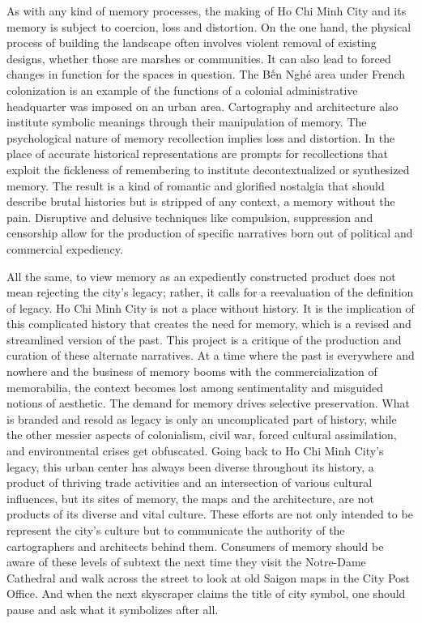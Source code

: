 As with any kind of memory processes, the making of Ho Chi Minh City and its memory is subject to coercion, loss and distortion. On the one hand, the physical process of building the landscape often involves violent removal of existing designs, whether those are marshes or communities. It can also lead to forced changes in function for the spaces in question. The Bến Nghé area under French colonization is an example of the functions of a colonial administrative headquarter was imposed on an urban area. Cartography and architecture also institute symbolic meanings through their manipulation of memory. The psychological nature of memory recollection implies loss and distortion. In the place of accurate historical representations are prompts for recollections that exploit the fickleness of remembering to institute decontextualized or synthesized memory.  The result is a kind of romantic and glorified nostalgia that should describe brutal histories but is stripped of any context, a memory without the pain. Disruptive and delusive techniques like compulsion, suppression and censorship allow for the production of specific narratives born out of political and commercial expediency.

All the same, to view memory as an expediently constructed product does not mean rejecting the city’s legacy; rather, it calls for a reevaluation of the definition of legacy. Ho Chi Minh City is not a place without history. It is the implication of this complicated history that creates the need for memory, which is a revised and streamlined version of the past. This project is a critique of the production and curation of these alternate narratives. At a time where the past is everywhere and nowhere and the business of memory booms with the commercialization of memorabilia, the context becomes lost among sentimentality and misguided notions of aesthetic. The demand for memory drives selective preservation. What is branded and resold as legacy is only an uncomplicated part of history, while the other messier aspects of colonialism, civil war, forced cultural assimilation, and environmental crises get obfuscated. Going back to Ho Chi Minh City’s legacy, this urban center has always been diverse throughout its history, a product of thriving trade activities and an intersection of various cultural influences, but its sites of memory, the maps and the architecture, are not products of its diverse and vital culture. These efforts are not only intended to be represent the city’s culture but to communicate the authority of the cartographers and architects behind them. Consumers of memory should be aware of these levels of subtext the next time they visit the Notre-Dame Cathedral and walk across the street to look at old Saigon maps in the City Post Office. And when the next skyscraper claims the title of city symbol, one should pause and ask what it symbolizes after all.

